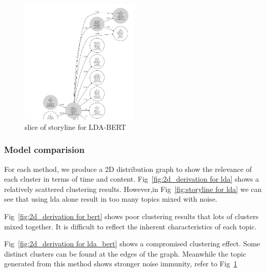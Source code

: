 \begin{figure}[h]
\centering
\includegraphics[width=0.5\textwidth]{imgs/lda_bert/storyline.png}
\caption{slice of storyline for LDA-BERT}
\label{fig:storyline for lda_bert}
\end{figure}


\subsubsection{Model comparision}
For each method, we produce a 2D distribution graph to show the relevance of each cluster in terms of time and content. Fig~\ref{fig:2d_derivation for lda} shows a relatively scattered clustering results. However,in Fig~\ref{fig:storyline for lda} we can see that using lda alone result in too many topics mixed with noise. 

Fig~\ref{fig:2d_derivation for bert} shows poor clustering results that lots of clusters mixed together. It is difficult to reflect the inherent characteristics of each topic.

Fig~\ref{fig:2d_derivation for lda_bert} shows a compromised clustering effect. Some distinct clusters can be found at the edges of the graph. Meanwhile the topic generated from this method shows stronger noise immunity, refer to Fig~\ref{fig:storyline for lda_bert}

